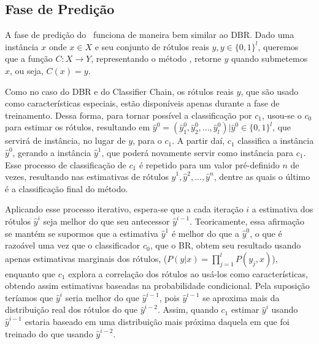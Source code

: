  
 \subsection{Fase de Predição}
 A fase de predição do \MRLMa~funciona de maneira bem similar ao DBR.
 Dado uma instância $x$ onde $x\in X$ e seu conjunto de rótulos reais $y,y \in {\{0,1\}}^l$, queremos que a função $C:X\rightarrow Y$,
 representando o método \MRLMa, retorne $y$ quando submetemos $x$, ou seja, $C(x)=y$.
 
 Como no caso do DBR e do Classifier Chain, os rótulos reais $y$, que são usado como características especiais,
 estão disponíveis apenas durante a fase de treinamento. Dessa forma, para tornar possível a classificação por $c_1$, usou-se o $c_0$ para
 estimar os rótulos, %
 resultando em $\hat{y}^0=(\hat{y}_1^0,\hat{y}_2^0,...,\hat{y}_l^0) | \hat{y}^0 \in \{0,1\}^l$, que servirá de instância, no lugar de $y$,
 para o $c_1$.
 A partir daí, $c_1$ classifica a instância $\hat{y}^0$, gerando a instância $\hat{y}^1$, que poderá novamente servir como
 instância para $c_1$. Esse processo de classificação de $c_1$ é repetido para um valor pré-definido $n$ de vezes,
 resultando nas estimativas de rótulos $\hat{y}^1,\hat{y}^2,...,\hat{y}^n$, dentre as quais o último é a classificação final do método.

 Aplicando esse processo iterativo, espera-se que a cada iteração $i$ a estimativa dos rótulos $\hat{y}^i$ seja melhor do que
 seu antecessor $\hat{y}^{i-1}$. Teoricamente, essa afirmação se mantém se supormos que a estimativa $\hat{y}^1$ é melhor do que a $\hat{y}^0$, 
 o que é razoável uma vez que o classificador $c_0$, que o BR, obtem seu resultado usando apenas estimativas marginais dos rótulos,
 ($P(y|x)=\prod_{j=1}^l{P(y_j,x)}$), enquanto que $c_1$ explora a correlação dos rótulos ao usá-los como características, obtendo assim 
 estimativas baseadas na probabilidade condicional.
 Pela suposição teríamos que $\hat{y}^i$ seria melhor do que $\hat{y}^{i-1}$, pois $\hat{y}^{i-1}$ se aproxima
 mais da distribuição real dos rótulos do que $\hat{y}^{i-2}$. Assim, quando $c_1$ estimar $\hat{y}^i$ usando $\hat{y}^{i-1}$ estaria baseado em 
 uma distribuição mais próxima daquela em que foi treinado do que usando $\hat{y}^{i-2}$.
 
 
 
 
 
 
 
 
 
